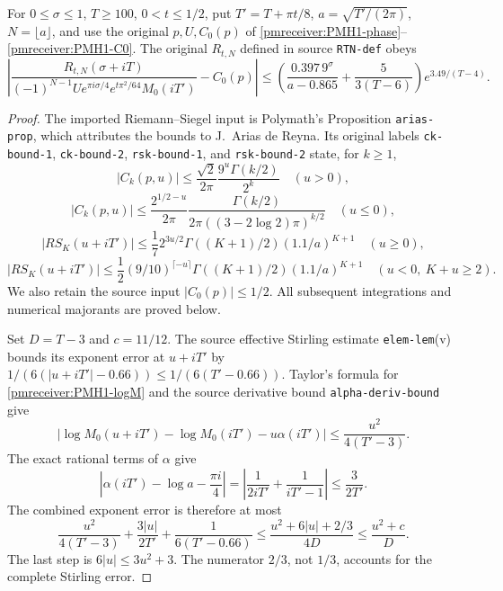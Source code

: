 \documentclass[11pt]{article}
\begin{document}
\begin{pmreceivertheorem}
\label{pmreceiver:PMH11}
For $0\le\sigma\le1$, $T\ge100$, $0<t\le1/2$, put
$T'=T+\pi t/8$, $a=\sqrt{T'/(2\pi)}$, $N=\lfloor a\rfloor$,
and use the original $p,U,C_0(p)$ of
\eqref{pmreceiver:PMH1-phase}--\eqref{pmreceiver:PMH1-C0}. The original $R_{t,N}$
defined in source \texttt{RTN-def} obeys
\begin{equation}\label{pmreceiver:PMH11-final}
 \left|\frac{R_{t,N}(\sigma+iT)}
 {(-1)^{N-1}Ue^{\pi i\sigma/4}e^{t\pi^2/64}M_0(iT')}-C_0(p)\right|
 \le\left(\frac{0.397\,9^\sigma}{a-0.865}
               +\frac5{3(T-6)}\right)e^{3.49/(T-4)}.
\end{equation}
\end{pmreceivertheorem}
\begin{proof}
The imported Riemann--Siegel input is Polymath's Proposition
\texttt{arias-prop}, which attributes the bounds to J.~Arias de
Reyna. Its original labels \texttt{ck-bound-1},
\texttt{ck-bound-2}, \texttt{rsk-bound-1}, and
\texttt{rsk-bound-2} state, for $k\ge1$,
\[
 |C_k(p,u)|\le\frac{\sqrt2}{2\pi}
       \frac{9^u\Gamma(k/2)}{2^k}\quad(u>0),
\]
\[
 |C_k(p,u)|\le\frac{2^{1/2-u}}{2\pi}
       \frac{\Gamma(k/2)}{2\pi((3-2\log2)\pi)^{k/2}}
       \quad(u\le0),
\]
\[
 |RS_K(u+iT')|\le\frac17 2^{3u/2}\Gamma((K+1)/2)(1.1/a)^{K+1}
       \quad(u\ge0),
\]
\[
 |RS_K(u+iT')|\le\frac12(9/10)^{\lceil-u\rceil}
       \Gamma((K+1)/2)(1.1/a)^{K+1}
       \quad(u<0,\ K+u\ge2).
\]
We also retain the source input $|C_0(p)|\le1/2$. All subsequent
integrations and numerical majorants are proved below.

Set $D=T-3$ and $c=11/12$. The source effective Stirling estimate
\texttt{elem-lem}(v) bounds its exponent error at $u+iT'$ by
$1/(6(|u+iT'|-0.66))\le1/(6(T'-0.66))$.
Taylor's formula for \eqref{pmreceiver:PMH1-logM} and the source derivative
bound \texttt{alpha-deriv-bound} give
\[
 |\log M_0(u+iT')-\log M_0(iT')-u\alpha(iT')|
 \le\frac{u^2}{4(T'-3)}.
\]
The exact rational terms of $\alpha$ give
\[
 \left|\alpha(iT')-\log a-\frac{\pi i}{4}\right|
 =\left|\frac1{2iT'}+\frac1{iT'-1}\right|\le\frac3{2T'}.
\]
The combined exponent error is therefore at most
\begin{equation}\label{pmreceiver:PMH11-pointwise}
 \frac{u^2}{4(T'-3)}+\frac{3|u|}{2T'}+\frac1{6(T'-0.66)}
 \le\frac{u^2+6|u|+2/3}{4D}
 \le\frac{u^2+c}{D}.
\end{equation}
The last step is $6|u|\le3u^2+3$. The numerator $2/3$, not
$1/3$, accounts for the complete Stirling error.


\end{proof}
\end{document}
